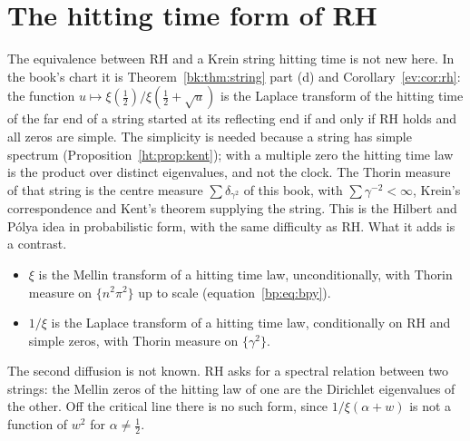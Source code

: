 \section{The hitting time form of RH}\label{mt:sec:hit}
The equivalence between RH and a Krein string hitting time is not new here. In the book's chart it is Theorem~\ref{bk:thm:string} part (d) and Corollary~\ref{ev:cor:rh}: the function $u\mapsto\xi(\frac12)/\xi(\frac12+\sqrt u)$ is the Laplace transform of the hitting time of the far end of a string started at its reflecting end if and only if RH holds and all zeros are simple. The simplicity is needed because a string has simple spectrum (Proposition~\ref{ht:prop:kent}); with a multiple zero the hitting time law is the product over distinct eigenvalues, and not the clock. The Thorin measure of that string is the centre measure $\sum\delta_{\gamma^2}$ of this book, with $\sum\gamma^{-2}<\infty$, Krein's correspondence and Kent's theorem \cite{DymMcKean76,KotaniWatanabe82,Kent80} supplying the string. This is the Hilbert and P\'olya idea in probabilistic form, with the same difficulty as RH. What it adds is a contrast.
\begin{itemize}
\item $\xi$ is the Mellin transform of a hitting time law, unconditionally, with Thorin measure on $\{n^2\pi^2\}$ up to scale (equation~\eqref{bp:eq:bpy}).
\item $1/\xi$ is the Laplace transform of a hitting time law, conditionally on RH and simple zeros, with Thorin measure on $\{\gamma^2\}$.
\end{itemize}
The second diffusion is not known. RH asks for a spectral relation between two strings: the Mellin zeros of the hitting law of one are the Dirichlet eigenvalues of the other. Off the critical line there is no such form, since $1/\xi(\alpha+w)$ is not a function of $w^2$ for $\alpha\ne\frac12$.


